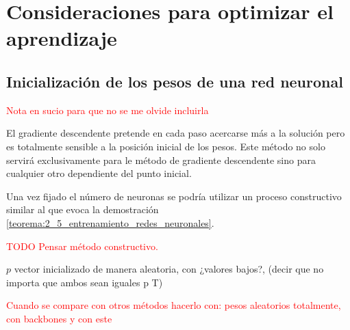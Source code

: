 
\section{Consideraciones para optimizar el aprendizaje }  

\subsection{ Inicialización de los pesos de una red neuronal}  

\textcolor{red}{Nota en sucio para que no se me olvide incluirla}  

El gradiente descendente pretende en cada 
paso acercarse más a la solución pero es 
totalmente sensible a la posición inicial 
de los pesos. Este método no solo servirá exclusivamente para le método de gradiente descendente 
sino para cualquier otro dependiente del punto inicial. 

Una vez fijado el número de neuronas se podría utilizar un proceso constructivo similar al que evoca la demostración \ref{teorema:2_5_entrenamiento_redes_neuronales}. 

\textcolor{red}{ TODO
Pensar método constructivo.} 

$p$ vector inicializado de manera aleatoria, con ¿valores bajos?,
(decir que no importa que ambos sean iguales p T)


\textcolor{red}{Cuando se compare con otros métodos hacerlo con: pesos aleatorios totalmente, con backbones y con este}

